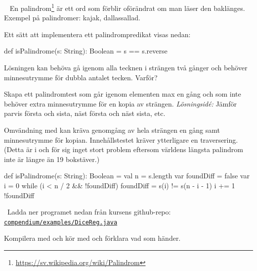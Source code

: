 \QUESTEND







\QUESTBEGIN

\Task  \what~ En palindrom\footnote{\url{https://sv.wikipedia.org/wiki/Palindrom}} är ett ord som förblir oförändrat om man läser den baklänges. Exempel på palindromer: kajak, dallassallad.

Ett sätt att implementera ett palindrompredikat visas nedan:
\begin{Code}
def isPalindrome(s: String): Boolean = s == s.reverse
\end{Code}

\Subtask Lösningen kan behöva gå igenom alla tecknen i strängen två gånger och behöver minnesutrymme för dubbla antalet tecken. Varför?

\Subtask Skapa ett palindromtest som går igenom elementen max en gång och som inte behöver extra minnesutrymme för en kopia av strängen. \emph{Lösningsidé:} Jämför parvis första och sista, näst första och näst sista, etc.

\SOLUTION

\TaskSolved \what

\SubtaskSolved Omvändning med  kan kräva genomgång av hela strängen en gång samt minnesutrymme för kopian. Innehållstestet kräver ytterligare en traversering. (Detta är i och för sig inget stort problem eftersom världens längsta palindrom inte är längre än 19 bokstäver.)

\SubtaskSolved

\begin{Code}
def isPalindrome(s: String): Boolean = {
  val n = s.length
  var foundDiff = false
  var i = 0
  while (i < n / 2 && !foundDiff)  {
    foundDiff = s(i) != s(n - i - 1)
    i += 1
  }
  !foundDiff
}
\end{Code}

\QUESTEND





\QUESTBEGIN

\Task  \what~Ladda ner programet nedan från kursens github-repo: \href{https://raw.githubusercontent.com/lunduniversity/introprog/master/compendium/examples/DiceReg.java}{\texttt{compendium/examples/DiceReg.java}}


\Subtask
Kompilera med  och kör med  och förklara vad som händer.

